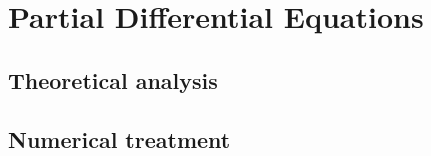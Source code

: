 \section{Partial Differential Equations}\label{sec:PDE}
\subsection{Theoretical analysis} \label{sec:theoPDE}
\subsection{Numerical treatment} \label{sec:numPDE}
\lipsum
